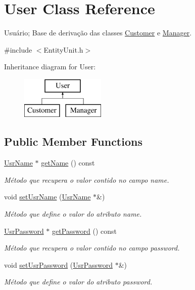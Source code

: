 \hypertarget{classUser}{\section{User Class Reference}
\label{d9/dc0/classUser}
}


Usuário; Base de derivação das classes \hyperlink{classCustomer}{Customer} e \hyperlink{classManager}{Manager}.  




{\ttfamily \#include $<$Entity\-Unit.\-h$>$}

Inheritance diagram for User\-:\begin{figure}[H]
\begin{center}
\leavevmode
\includegraphics[height=2.000000cm]{d9/dc0/classUser}
\end{center}
\end{figure}
\subsection*{Public Member Functions}
\begin{DoxyCompactItemize}
\item 
\hyperlink{classUsrName}{Usr\-Name} $\ast$ \hyperlink{classUser_a8231eb8e4de791293b7e66d848525f89}{get\-Name} () const 
\begin{DoxyCompactList}\small\item\em Método que recupera o valor contido no campo name. \end{DoxyCompactList}\item 
void \hyperlink{classUser_a7bd7509f67ef4eb04fda2fa175bc6701}{set\-Usr\-Name} (\hyperlink{classUsrName}{Usr\-Name} $\ast$\&)
\begin{DoxyCompactList}\small\item\em Método que define o valor do atributo name. \end{DoxyCompactList}\item 
\hyperlink{classUsrPassword}{Usr\-Password} $\ast$ \hyperlink{classUser_a7aacde6da99ebfadf5dd2063139e5ca3}{get\-Password} () const 
\begin{DoxyCompactList}\small\item\em Método que recupera o valor contido no campo password. \end{DoxyCompactList}\item 
void \hyperlink{classUser_a0250673bf041a0a17ffb6b2a1d40bb62}{set\-Usr\-Password} (\hyperlink{classUsrPassword}{Usr\-Password} $\ast$\&)
\begin{DoxyCompactList}\small\item\em Método que define o valor do atributo password. \end{DoxyCompactList}\end{DoxyCompactItemize}
